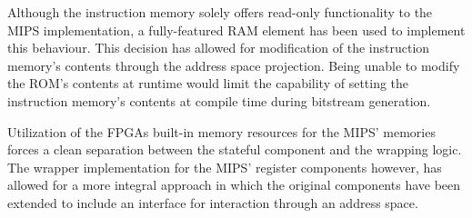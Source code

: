\documentclass{article}
\begin{document}
Although the instruction memory solely offers read-only functionality to the MIPS implementation, a fully-featured RAM element has been used to implement this behaviour. This decision has allowed for modification of the instruction memory's contents through the address space projection. Being unable to modify the ROM's contents at runtime would limit the capability of setting the instruction memory's contents at compile time during bitstream generation.

Utilization of the FPGAs built-in memory resources for the MIPS' memories forces a clean separation between the stateful component and the wrapping logic. The wrapper implementation for the MIPS' register components however, has allowed for a more integral approach in which the original components have been extended to include an interface for interaction through an address space. 
\end{document}
